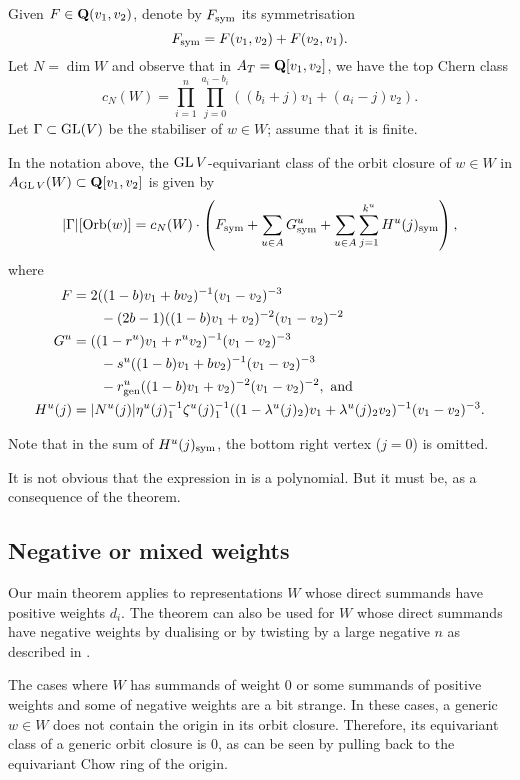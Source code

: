 \documentclass{amsart}
\DeclareMathOperator{\Orb}{Orb}
\begin{document}
Given \(F \in {\bf Q}(v_1,v_2)\), denote by \(F_{\rm sym}\) its symmetrisation
\[ F_{\rm sym} = F(v_1,v_2) + F(v_2,v_1).\]
Let \(N = \dim W\) and observe that in \(A_T = {\bf Q}[v_1,v_2]\), we have the top Chern class
\[ c_N(W) = \prod_{i=1}^n\prod_{j = 0}^{a_i-b_i}\left((b_{i}+j)v_1 + (a_i-j)v_2\right).\]
Let \(\Gamma \subset \operatorname{GL}(V)\) be the stabiliser of \(w \in W\); assume that it is finite.
\begin{theorem}\label{thm:main}
  In the notation above, the \(\operatorname{GL} V\)-equivariant class of the orbit closure of \(w \in W\) in \(A_{\operatorname{GL} V}(W) \subset {\bf Q}[v_1,v_2]\) is given by
  \begin{equation}\label{eqn:main}
    |\Gamma|[\Orb(w)] =    c_N(W) \cdot\left( F_{\rm sym} + \sum_{u \in A} G^u_{\rm sym} + \sum_{u \in A} \sum_{j = 1}^{k^u} H^u(j)_{\rm sym}\right),
  \end{equation}
  where
  \begin{align*}
    F &= 2((1-b)v_1+bv_2)^{-1}(v_1-v_2)^{-3} \\
    & \qquad - (2b-1)((1-b)v_1+v_2)^{-2}(v_1-v_2)^{-2} \\
    G^u &= ((1-r^u)v_1 + r^uv_2)^{-1}(v_1-v_2)^{-3} \\
      & \qquad -s^u((1-b)v_1+bv_2)^{-1}(v_1-v_2)^{-3} \\
    &\qquad -r_{\rm gen}^u((1-b)v_1+v_2)^{-2}(v_1-v_2)^{-2}, \text{ and }\\
    H^u(j) &= |N^u(j)|\eta^u(j)_1^{-1}\zeta^u(j)_{1}^{-1}((1-\lambda^u(j)_2)v_1 + \lambda^u(j)_2v_2)^{-1}(v_1-v_2)^{-3}.
  \end{align*}    
\end{theorem}
Note that in the sum of \(H^u(j)_{\rm sym}\), the bottom right vertex (\(j = 0\)) is omitted.
\begin{remark}
  It is not obvious that the expression in  is a polynomial.
  But it must be, as a consequence of the theorem.
\end{remark}

\subsection{Negative or mixed weights}\label{sec:mixed}
Our main theorem applies to representations \(W\) whose direct summands have positive weights \(d_i\).
The theorem can also be used for \(W\) whose direct summands have negative weights by dualising or by twisting by a large negative \(n\) as described in .

The cases where \(W\) has summands of weight 0 or some summands of positive weights and some of negative weights are a bit strange.
In these cases, a generic \(w \in W\) does not contain the origin in its orbit closure.
Therefore, its equivariant class of a generic orbit closure is \(0\), as can be seen by pulling back to the equivariant Chow ring of the origin.
\end{document}
